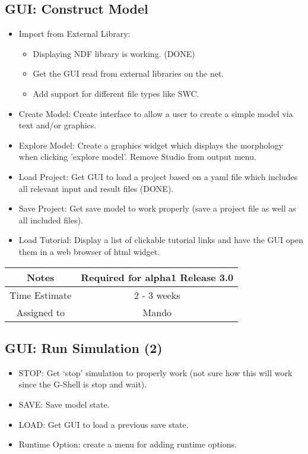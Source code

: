 \documentclass[12pt]{article}
\begin{document}
\subsection{GUI: Construct Model}

\begin{itemize}
\item Import from External Library:
  \begin{itemize}
  \item Displaying NDF library is working. (DONE)
  \item Get the GUI read from external libraries on the net.
  \item Add support for different file types like SWC.
  \end{itemize}
\item Create Model: Create interface to allow a user to create a
  simple model via text and/or graphics.
\item Explore Model: Create a graphics widget which displays the
  morphology when clicking 'explore model'.  Remove Studio from output
  menu.
\item Load Project: Get GUI to load a project based on a yaml file
  which includes all relevant input and result files (DONE).
\item Save Project: Get save model to work properly (save a project
  file as well as all included files).
\item Load Tutorial: Display a list of clickable tutorial links and
  have the GUI open them in a web browser of html widget.
\end{itemize}

{
  \vspace{5mm}
  \centering
  \begin{tabular}{|c|c|}
    \hline
    Notes
    & Required for alpha1 Release 3.0 \\
    \hline
    Time Estimate
    & 2 - 3 weeks \\
    \hline
    Assigned to
    & Mando \\
    \hline
  \end{tabular}
}


\subsection{GUI: Run Simulation (2)}
\begin{itemize}
\item STOP: Get `stop' simulation to properly work (not sure how this
  will work since the G-Shell is stop and wait).
\item SAVE: Save model state. 
\item LOAD: Get GUI to load a previous save state.
\item Runtime Option: create a menu for adding runtime options.
\end{itemize}
\end{document}

